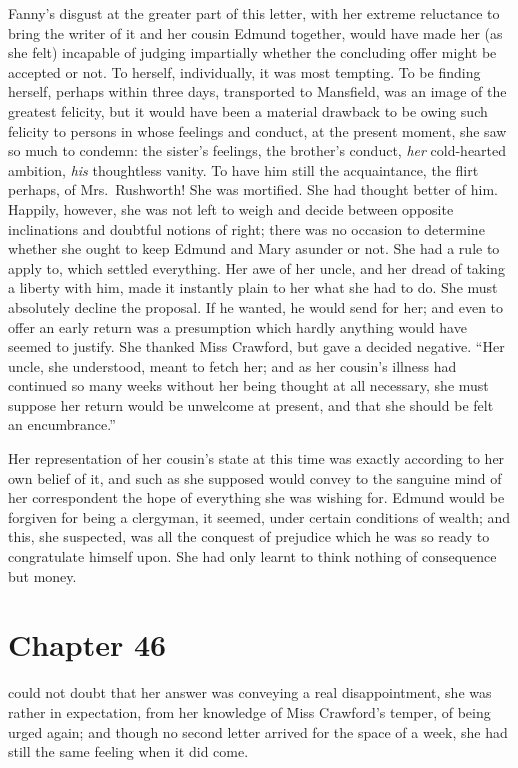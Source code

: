Fanny's disgust at the greater part of this letter,
with her extreme reluctance to bring the writer of it
and her cousin Edmund together, would have made her (as
she felt) incapable of judging impartially whether
the concluding offer might be accepted or not.
To herself, individually, it was most tempting.  To be
finding herself, perhaps within three days, transported
to Mansfield, was an image of the greatest felicity,
but it would have been a material drawback to be owing
such felicity to persons in whose feelings and conduct,
at the present moment, she saw so much to condemn:
the sister's feelings, the brother's conduct,
\emph{her} cold-hearted ambition, \emph{his} thoughtless vanity.
To have him still the acquaintance, the flirt perhaps,
of Mrs.\ Rushworth!  She was mortified.  She had thought
better of him.  Happily, however, she was not left to weigh
and decide between opposite inclinations and doubtful
notions of right; there was no occasion to determine
whether she ought to keep Edmund and Mary asunder or not.
She had a rule to apply to, which settled everything.
Her awe of her uncle, and her dread of taking a liberty
with him, made it instantly plain to her what she
had to do.  She must absolutely decline the proposal.
If he wanted, he would send for her; and even to offer
an early return was a presumption which hardly anything
would have seemed to justify.  She thanked Miss Crawford,
but gave a decided negative.  ``Her uncle, she understood,
meant to fetch her; and as her cousin's illness had continued
so many weeks without her being thought at all necessary,
she must suppose her return would be unwelcome at present,
and that she should be felt an encumbrance.''

Her representation of her cousin's state at this time
was exactly according to her own belief of it, and such
as she supposed would convey to the sanguine mind of her
correspondent the hope of everything she was wishing for.
Edmund would be forgiven for being a clergyman, it seemed,
under certain conditions of wealth; and this, she suspected,
was all the conquest of prejudice which he was so ready
to congratulate himself upon.  She had only learnt to think
nothing of consequence but money.



\chapter{Chapter 46}

 could not doubt that her answer was conveying
a real disappointment, she was rather in expectation,
from her knowledge of Miss Crawford's temper, of being
urged again; and though no second letter arrived for the
space of a week, she had still the same feeling when it
did come.

